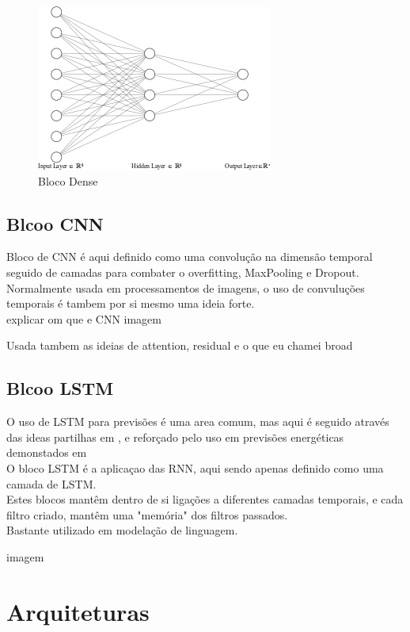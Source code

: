 \begin{figure}[H]
	\centering
	\includegraphics{Imagens/dense_layer.png}
	\caption{Bloco Dense}
	\label{fig:dense_blcok}
\end{figure}
	
\subsection{Blcoo CNN\label{se:cnn}}

Bloco de CNN é aqui definido como uma convolução na dimensão temporal seguido de camadas para combater o overfitting, MaxPooling e Dropout. \\
Normalmente usada em processamentos de imagens, o uso de convuluções temporais é tambem por si mesmo uma ideia forte. \\

explicar om que e CNN
imagem

Usada tambem as ideias de attention, residual e o que eu chamei broad


\subsection{Blcoo LSTM\label{se:lstm}}

O uso de LSTM para previsões é uma area comum, mas aqui é seguido através das ideas partilhas em \cite{Hewamalage2021}, e reforçado pelo uso em previsões energéticas demonstados em \cite{Costa2022} \\
O bloco LSTM é a aplicaçao das RNN, aqui sendo apenas definido como uma camada de LSTM. \\
Estes blocos mantêm dentro de si ligações a diferentes camadas temporais, e cada filtro criado, mantêm uma "memória" dos filtros passados. \\
Bastante utilizado em modelação de linguagem.

imagem


\section{Arquiteturas \label{se:arquitecturas}}

